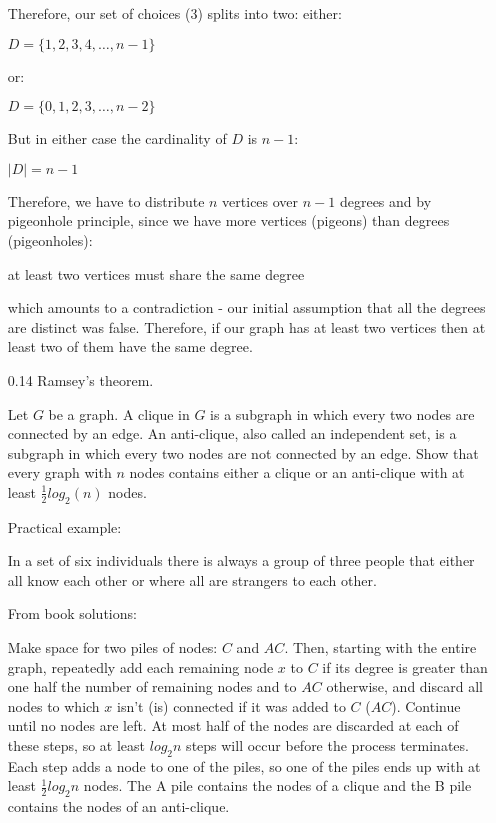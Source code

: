 \begin{enumerate}
            Therefore, our set of choices (3) splits into two: either:
            
            $D = \{ 1 , 2 , 3 , 4 , \ldots ,n - 1 \}$
            
            or:
            
            $D = \{ 0, 1, 2, 3, \ldots , n-2\}$
            
            
            But in either case the cardinality of $D$ is $n-1$:
            
            $|D|=n-1$
            
            Therefore, we have to distribute $n$ vertices over $n-1$ degrees and by pigeonhole principle, since we have more vertices (pigeons) than degrees (pigeonholes):
            
            at least two vertices must share the same degree
            
            which amounts to a contradiction - our initial assumption that all the degrees are distinct was false. Therefore, if our graph has at least two vertices then at least two of them have the same degree.
            
      \item[0.14]
            Ramsey's theorem.
            
            Let $G$ be a graph. A clique in $G$ is a subgraph in which every two nodes are connected by an edge. An anti-clique, also called an independent set, is a subgraph in which every two nodes are not connected by an edge. Show that every graph with $n$ nodes contains either a clique or an anti-clique with at least $\frac{1}{2} log_2(n)$ nodes.
            
            Practical example:
            
            In a set of six individuals there is always a group of three people that either all know each other or where all are strangers to each other.
            
            From book solutions:
            
            Make space for two piles of nodes: $C$ and $AC$. Then, starting with the entire graph, repeatedly add each remaining node $x$ to $C$ if its degree is greater than one half the number of remaining nodes and to $AC$ otherwise, and discard all nodes to which $x$ isn’t (is) connected if it was added to $C$ ($AC$). Continue until no nodes are left. At most half of the nodes are discarded at each of these steps, so at least $log_2 n$ steps will occur before the process terminates. Each step adds a node to one of the piles, so one of the piles ends up with at least $\frac{1}{2} log_2 n$ nodes. The A pile contains the nodes of a clique and the B pile contains the nodes of an anti-clique.
            

\end{enumerate}
